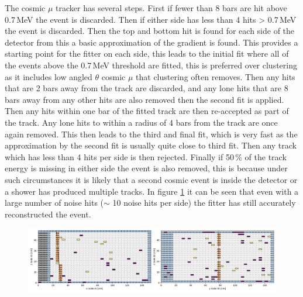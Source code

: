 The cosmic $\mu$ tracker has several steps. First if fewer than 8 bars are hit above 0.7\,MeV the event is discarded. Then if either side has less than 4 hits > 0.7\,MeV the event is discarded. Then the top and bottom hit is found for each side of the detector from this a basic approximation of the gradient is found. This provides a starting point for the fitter on each side, this leads to the initial fit where all of the events above the 0.7\,MeV threshold are fitted, this is preferred over clustering as it includes low angled $\theta$ cosmic $\mu$ that clustering often removes. Then any hits that are 2 bars away from the track are discarded, and any lone hits that are 8 bars away from any other hits are also removed then the second fit is applied. Then any hits within one bar of the fitted track are then re-accepted as part of the track. Any lone hits to within a radius of 4 bars from the track are once again removed. This then leads to the third and final fit, which is very fast as the approximation by the second fit is usually quite close to third fit. Then any track which has less than 4 hits per side is then rejected. Finally if 50\,\% of the track energy is missing in either side the event is also removed, this is because under such circumstances it is likely that a second cosmic event is inside the detector or a shower has produced multiple tracks. In figure \ref{fig:3000ExampleEvent} it can be seen that even with a large number of noise hits ($\sim$ 10 noise hits per side) the fitter has still accurately reconstructed the event. 
 
\begin{figure}[H]
 \centering
 \includegraphics[width=\linewidth]{Chapter5/Figs/Raster/testEventNewScheme.png}
 \label{fig:3000ExampleEvent}
\end{figure}

